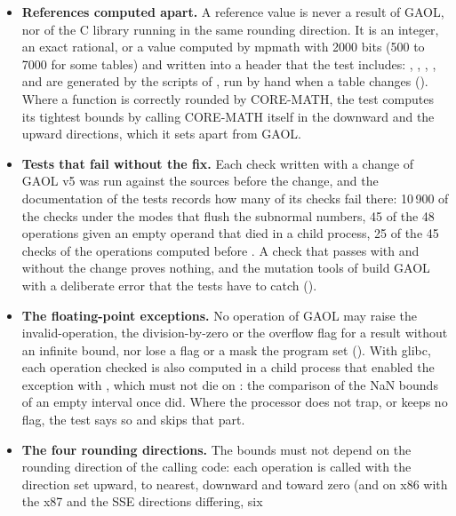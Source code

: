 \documentclass[12pt,a4paper,twoside,openright]{book}
\begin{document}
\begin{itemize}
\item[$\bullet$] \textbf{References computed apart.} A reference value is
  never a result of GAOL, nor of the C library running in the same rounding
  direction. It is an integer, an exact rational, or a value computed by
  mpmath with 2000 bits (500 to 7000 for some tables) and written into a
  header that the test includes: ,
  , ,
  ,  and
   are generated by the scripts
   of , run by hand when a table changes
  (). Where a function is correctly rounded by CORE-MATH,
  the test computes its tightest bounds by calling CORE-MATH itself in the
  downward and the upward directions, which it sets apart from GAOL.
\item[$\bullet$] \textbf{Tests that fail without the fix.} Each check
  written with a change of GAOL v5 was run against the sources before the
  change, and the documentation of the tests records how many of its checks
  fail there: 10\,900 of the checks under the modes that flush the subnormal
  numbers, 45 of the 48 operations given an empty operand that died in a
  child process, 25 of the 45 checks of the operations computed before
  . A check that passes with and without the change proves
  nothing, and the mutation tools of  build GAOL with a
  deliberate error that the tests have to catch ().
\item[$\bullet$] \textbf{The floating-point exceptions.} No operation of GAOL
  may raise the invalid-operation, the division-by-zero or the overflow flag
  for a result without an infinite bound, nor lose a flag or a mask the
  program set (). With glibc, each operation
  checked is also computed in a child process that enabled the exception
  with , which must not die on : the
  comparison of the NaN bounds of an empty interval once did. Where the
  processor does not trap, or keeps no flag, the test says so and skips
  that part.
\item[$\bullet$] \textbf{The four rounding directions.} The bounds must not
  depend on the rounding direction of the calling code: each operation is
  called with the direction set upward, to nearest, downward and toward
  zero (and on x86 with the x87 and the SSE directions differing, six

\end{itemize}
\end{document}
